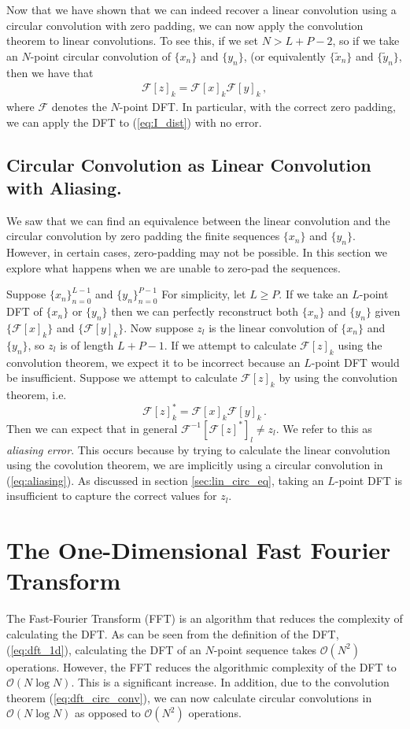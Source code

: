\documentclass[12pt]{CSUNthesis}
\def\calF{\mathcal{F}}
\begin{document}
	Now that we have shown that we can indeed recover a linear convolution using a circular convolution with zero padding, we can now apply the convolution theorem to linear convolutions.  To see this, if we set $N > L+P-2$, so if we take an $N$-point circular convolution of $\{x_n\}$ and $\{y_n\}$, (or equivalently $\{\tilde{x}_n\}$ and $\{\tilde{y}_n\}$, then we have that
\begin{align*}
\calF[z]_k = \calF[x]_k \calF[y]_k\, ,
\end{align*}
where $\calF$ denotes the $N$-point DFT. In particular, with the correct zero padding, we can apply the DFT to (\ref{eq:I_dist}) with no error.
\subsection{Circular Convolution as Linear Convolution with Aliasing.}
\label{sec:lin_as_circ}
We saw that we can find an equivalence between the linear convolution and the circular convolution by zero padding the finite sequences $\{ x_n\}$ and $\{y_n\}$. However, in certain cases, zero-padding may not be possible. In this section we explore what happens when we are unable to zero-pad the sequences.

Suppose $\{x_n\}_{n=0}^{L-1}$ and $\{y_n\}_{n=0}^{P-1}$ For simplicity, let $L \geq P$. If we take an $L$-point DFT of $\{x_n\}$ or $\{y_n\}$ then we can perfectly reconstruct both $\{x_n\}$ and $\{y_n\}$ given $\{ \calF[x]_k \}$ and $\{ \calF[y]_k \}$. Now suppose $z_l$ is the linear convolution of $\{x_n\}$ and $\{y_n\}$, so $z_l$ is of length $L+P-1$. 
If we attempt to calculate $\calF[z]_k$ using the convolution theorem, we expect it to be incorrect because an $L$-point DFT would be insufficient. 
Suppose we attempt to calculate $\calF[z]_k$ by using the convolution theorem, i.e. 
\begin{equation}
\label{eq:aliasing}
\calF[z]_k^* = \calF[x]_k \calF[y]_k \, . 
\end{equation}
Then we can expect that in general $\calF^{-1}[\calF[z]^*]_l \not = z_l$. We refer to this as \textit{aliasing error}. This occurs because by trying to calculate the linear convolution using the covolution theorem, we are implicitly using a circular convolution in (\ref{eq:aliasing}). As discussed in section \ref{sec:lin_circ_eq}, taking an $L$-point DFT is insufficient to capture the correct values for $z_l$. 

\section{The One-Dimensional Fast Fourier Transform}
The Fast-Fourier Transform (FFT) is an algorithm that reduces the complexity of calculating the DFT. As can be seen from the definition of the DFT, (\ref{eq:dft_1d}), calculating the DFT of an $N$-point sequence takes $\mathcal{O}(N^2)$ operations. However, the FFT reduces the algorithmic complexity of the DFT to $\mathcal{O}(N \log N)$. This is a significant increase. In addition, due to the convolution theorem (\ref{eq:dft_circ_conv}), we can now calculate circular convolutions in $\mathcal{O}(N \log N)$ as opposed to $\mathcal{O}(N^2)$ operations.
\end{document}

